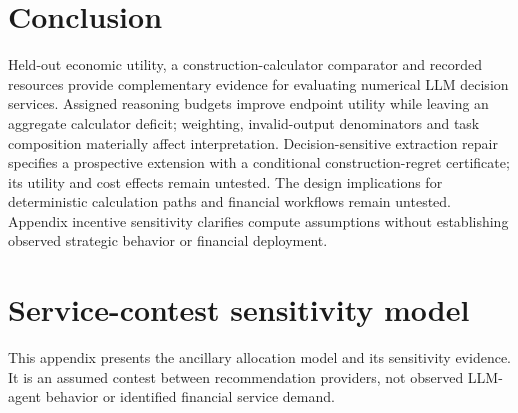 \documentclass[sigconf,anonymous,nonacm]{acmart}
\begin{document}
\section{Conclusion}
Held-out economic utility, a construction-calculator comparator and recorded resources provide complementary evidence for evaluating numerical LLM decision services. Assigned reasoning budgets improve endpoint utility while leaving an aggregate calculator deficit; weighting, invalid-output denominators and task composition materially affect interpretation. Decision-sensitive extraction repair specifies a prospective extension with a conditional construction-regret certificate; its utility and cost effects remain untested. The design implications for deterministic calculation paths and financial workflows remain untested. Appendix incentive sensitivity clarifies compute assumptions without establishing observed strategic behavior or financial deployment.
\FloatBarrier
\balance


\clearpage
\nobalance
\appendix
\section{Service-contest sensitivity model}\label{app:servicecontest}
This appendix presents the ancillary allocation model and its sensitivity evidence. It is an assumed contest between recommendation providers, not observed LLM-agent behavior or identified financial service demand.

\end{document}
